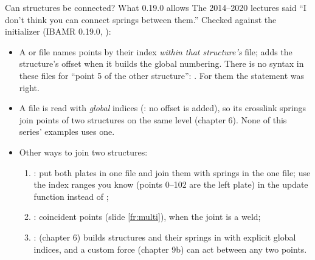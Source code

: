 \documentclass[aspectratio=169,11pt]{beamer}
\begin{document}
\begin{frame}{Can structures be connected? What 0.19.0 allows}
\label{fr:connect}
\small The 2014--2020 lectures said ``I don't think you can connect springs between them.'' Checked against the initializer (IBAMR 0.19.0, ):
\begin{itemize}
  \item A  or  file names points by their index \emph{within that structure's}  file;  adds the structure's offset when it builds the global numbering. There is no syntax in these files for ``point 5 of the other structure'': . For them the statement was right.
  \item A  file is read with \emph{global} indices (: no offset is added), so its crosslink springs  join points of two structures on the same level (chapter 6). None of this series' examples uses one.
  \item Other ways to join two structures:
  \begin{enumerate}
    \item {}: put both plates in one  file and join them with springs in the one  file; use the index ranges you know (points 0--102 are the left plate) in the update function instead of ;
    \item {}: coincident points (slide \ref{fr:multi}), when the joint is a weld;
    \item {}:  (chapter 6) builds structures and their springs in  with explicit global indices, and a custom force (chapter 9b) can act between any two points.
  \end{enumerate}
\end{itemize}
\end{frame}
\end{document}
